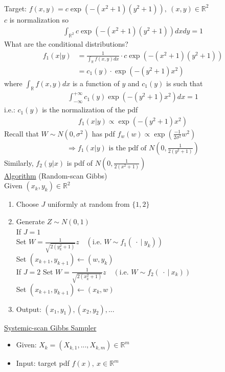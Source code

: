 \documentclass[12pt, letterpaper]{article}
\begin{document}
 \\
Target: $f(x,y) = c\exp(-(x^2+1)(y^2+1)),\ (x,y) \in \mathbb{R}^2$ \\
$c$ is normalization so
\begin{align*}
    \int_{\mathbb{R}^2} c \exp (-(x^2+1)(y^2+1)) dxdy = 1
\end{align*}
What are the conditional distributions?
\begin{align*}
    f_1(x | y) &= \frac{1}{\int_\mathbb{R}f(x,y)dx} \cdot c \exp(-(x^2+1)(y^2+1)) \\
    &= c_1(y)\cdot \exp (-(y^2+1)x^2)
\end{align*}
where $\int_\mathbb{R}f(x,y)dx$ is a function of $y$ and $c_1(y)$ is such that 
\begin{align*}
    \int_{-\infty}^{+\infty} c_1(y) \exp(-(y^2+1)x^2)dx=1
\end{align*}
i.e.: $c_1(y)$ is the normalization of the pdf 
\begin{align*}
    f_1(x|y) \propto \exp(-(y^2+1)x^2)
\end{align*}
Recall that $W \sim N(0, \sigma^2)$ has pdf $f_w(w) \propto \exp(\frac{-1}{2\sigma^2}w^2)$
\begin{align*}
    \Rightarrow f_1 (x|y) \text{ is the pdf of } N\left(0,\frac{1}{2(y^2+1)}\right)
\end{align*}
Similarly, $f_2 (y|x)$ is pdf of $N(0, \frac{1}{2(x^2+1)})$\\
\underline{Algorithm} (Random-scan Gibbs) \\
Given $(x_k, y_k) \in \mathbb{R}^2$
\begin{enumerate}
    \item Choose $J$ uniformly at random from $\{1,2\}$
    \item Generate $Z \sim N(0,1)$ \\
    If $J = 1$  \\
    Set $W = \frac{1}{\sqrt{2(y_k^2+1)}}z \quad (\text{i.e. } W \sim  f_1(\ \cdot\ |\ y_k))$ \\
    Set $(x_{k+1}, y_{k+1}) \leftarrow (w, y_k)$ \\
    If $J = 2$
    Set $W = \frac{1}{\sqrt{2(x_k^2+1)}}z \quad (\text{i.e. } W \sim  f_2(\ \cdot\ |\ x_k))$ \\
    Set $(x_{k+1}, y_{k+1}) \leftarrow (x_k, w)$
    \item Output: $(x_1, y_1), (x_2, y_2), ...$
\end{enumerate}
\underline{Systemic-scan Gibbs Sampler}
\begin{itemize}
    \item Given: $X_k = (X_{k,1}, ..., X_{k,m}) \in \mathbb{R}^m$
    \item Input: target pdf $f(x),\ x \in \mathbb{R}^m$
\end{itemize}
\end{document}

